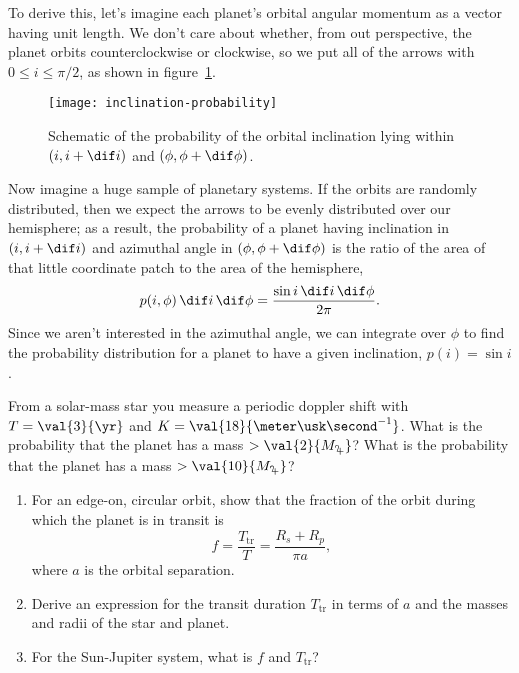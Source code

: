 To derive this, let's imagine each planet's orbital angular momentum as a vector having unit length.  We don't care about whether, from out perspective, the planet orbits counterclockwise or clockwise, so we put all of the arrows with $0\le i\le \pi/2$, as shown in figure~\ref{f.inclination-probability}.  

\begin{figure}[ht]
\forcerectofloat
\texttt{[image: inclination-probability]}
\caption[Schematic of the probability distribution of orbital inclination]{Schematic of the probability of the orbital inclination lying within $(i,i+\dif i)$ and $(\phi,\phi+\dif\phi)$.}
\label{f.inclination-probability}
\end{figure}

Now imagine a huge sample of planetary systems.  If the orbits are randomly distributed, then we expect the arrows to be evenly distributed over our hemisphere; as a result, the probability of a planet having inclination in $(i,i+\dif i)$ and azimuthal angle in $(\phi,\phi+\dif\phi)$ is the ratio of the area of that little coordinate patch to the area of the hemisphere,
\[ p(i,\phi)\,\dif i\,\dif \phi = \frac{\sin i\,\dif i\,\dif\phi}{2\pi}. \]
Since we aren't interested in the azimuthal angle, we can integrate over $\phi$ to find the probability distribution for a planet to have a given inclination, $p(i) = \sin i$.


\begin{exercisebox}
From a solar-mass star you measure a periodic doppler shift with $T = \val{3}{\yr}$ and $K = \val{18}{\meter\usk\second^{-1}}$.  What is the probability that the planet has a mass $>\val{2}{M_{\jupiter}}$? What is the probability that the planet has a mass $>\val{10}{M_{\jupiter}}$?
\end{exercisebox}

\begin{exercisebox}
\begin{enumerate}\renewcommand{\labelenumi}{\alph{enumi})}
\item\label{e.transit-fraction}
For an edge-on, circular orbit, show that the fraction of the orbit during which the planet is in transit is
\[ f = \frac{T_{\mathrm{tr}}}{T} = \frac{R_{s}+R_{p}}{\pi a}, \]
where $a$ is the orbital separation.

\item\label{e.transit-duration}
Derive an expression for the transit duration $T_{\mathrm{tr}}$ in terms of $a$ and the masses and radii of the star and planet.

\item\label{e.transit-properties-jupiter}
For the Sun-Jupiter system, what is $f$ and $T_{\mathrm{tr}}$?

\end{enumerate}
\end{exercisebox}

